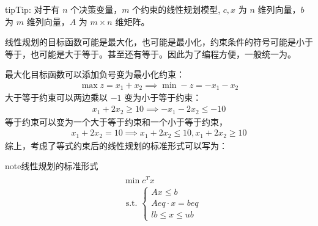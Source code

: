 \documentclass[letterpaper,10pt,english]{sphinxmanual}
\begin{document}
\begin{sphinxadmonition}{tip}{Tip:}
对于有 \(n\) 个决策变量，\(m\) 个约束的线性规划模型, \(c,x\) 为 \(n\) 维列向量，\(b\) 为 \(m\) 维列向量，\(A\) 为 \(m \times n\) 维矩阵。
\end{sphinxadmonition}

线性规划的目标函数可能是最大化，也可能是最小化，约束条件的符号可能是小于等于，也可能是大于等于。甚至还有等于。因此为了编程方便，一般统一为。

最大化目标函数可以添加负号变为最小化约束：
\begin{equation*}
\begin{split}
\max z = x_1 +  x_2 \implies \min -z = -x_1 - x_2
\end{split}
\end{equation*}
大于等于约束可以两边乘以 \(-1\) 变为小于等于约束：
\begin{equation*}
\begin{split}
x_1 + 2x_2 \geq 10 \implies -x_1 - 2x_2 \leq -10
\end{split}
\end{equation*}
等于约束可以变为一个大于等于约束和一个小于等于约束，
\begin{equation*}
\begin{split}
x_1 + 2x_2 = 10 \implies x_1 + 2x_2 \leq 10, x_1 + 2x_2 \geq 10
\end{split}
\end{equation*}
综上，考虑了等式约束后的线性规划的标准形式可以写为：

\begin{sphinxadmonition}{note}{线性规划的标准形式}
\begin{equation*}
\begin{split}
\begin{aligned}
&\min c^{T} x\\
&\text { s.t. }\left\{\begin{array}{l}
{A x \leq b} \\
{ Aeq  \cdot x=b e q} \\
{l b \leq x \leq u b}
\end{array}\right.
\end{aligned}
\end{split}
\end{equation*}\end{sphinxadmonition}
\end{document}
